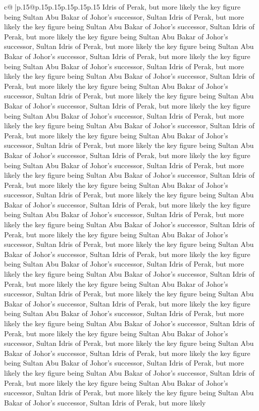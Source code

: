 \documentclass{article}
\begin{document}
{\begin{supertabular}{c@{$\;$}|p{.15\linewidth}@{}p{.15\linewidth}p{.15\linewidth}p{.15\linewidth}p{.15\linewidth}p{.15\linewidth}}
{{{Idris of Perak, but more likely the key figure being Sultan Abu Bakar of Johor's successor, Sultan Idris of Perak, but more likely the key figure being Sultan Abu Bakar of Johor's successor, Sultan Idris of Perak, but more likely the key figure being Sultan Abu Bakar of Johor's successor, Sultan Idris of Perak, but more likely the key figure being Sultan Abu Bakar of Johor's successor, Sultan Idris of Perak, but more likely the key figure being Sultan Abu Bakar of Johor's successor, Sultan Idris of Perak, but more likely the key figure being Sultan Abu Bakar of Johor's successor, Sultan Idris of Perak, but more likely the key figure being Sultan Abu Bakar of Johor's successor, Sultan Idris of Perak, but more likely the key figure being Sultan Abu Bakar of Johor's successor, Sultan Idris of Perak, but more likely the key figure being Sultan Abu Bakar of Johor's successor, Sultan Idris of Perak, but more likely the key figure being Sultan Abu Bakar of Johor's successor, Sultan Idris of Perak, but more likely the key figure being Sultan Abu Bakar of Johor's successor, Sultan Idris of Perak, but more likely the key figure being Sultan Abu Bakar of Johor's successor, Sultan Idris of Perak, but more likely the key figure being Sultan Abu Bakar of Johor's successor, Sultan Idris of Perak, but more likely the key figure being Sultan Abu Bakar of Johor's successor, Sultan Idris of Perak, but more likely the key figure being Sultan Abu Bakar of Johor's successor, Sultan Idris of Perak, but more likely the key figure being Sultan Abu Bakar of Johor's successor, Sultan Idris of Perak, but more likely the key figure being Sultan Abu Bakar of Johor's successor, Sultan Idris of Perak, but more likely the key figure being Sultan Abu Bakar of Johor's successor, Sultan Idris of Perak, but more likely the key figure being Sultan Abu Bakar of Johor's successor, Sultan Idris of Perak, but more likely the key figure being Sultan Abu Bakar of Johor's successor, Sultan Idris of Perak, but more likely the key figure being Sultan Abu Bakar of Johor's successor, Sultan Idris of Perak, but more likely the key figure being Sultan Abu Bakar of Johor's successor, Sultan Idris of Perak, but more likely the key figure being Sultan Abu Bakar of Johor's successor, Sultan Idris of Perak, but more likely the key figure being Sultan Abu Bakar of Johor's successor, Sultan Idris of Perak, but more likely the key figure being Sultan Abu Bakar of Johor's successor, Sultan Idris of Perak, but more likely the key figure being Sultan Abu Bakar of Johor's successor, Sultan Idris of Perak, but more likely the key figure being Sultan Abu Bakar of Johor's successor, Sultan Idris of Perak, but more likely the key figure being Sultan Abu Bakar of Johor's successor, Sultan Idris of Perak, but more likely the key figure being Sultan Abu Bakar of Johor's successor, Sultan Idris of Perak, but more likely the key figure being Sultan Abu Bakar of Johor's successor, Sultan Idris of Perak, but more likely the key figure being Sultan Abu Bakar of Johor's successor, Sultan Idris of Perak, but more likely the key figure being Sultan Abu Bakar of Johor's successor, Sultan Idris of Perak, but more likely }}}
\end{supertabular}}
\end{document}
